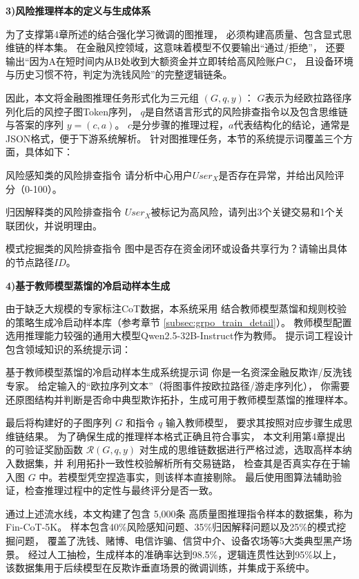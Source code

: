 \textbf{3)风险推理样本的定义与生成体系}

为了支撑第4章所述的结合强化学习微调的图推理，
必须构建高质量、包含显式思维链的样本集。
在金融风控领域，这意味着模型不仅要输出“通过/拒绝”，
还要输出“因为A在短时间内从B处收到大额资金并立即转给高风险账户C，
且设备环境与历史习惯不符，判定为洗钱风险”的完整逻辑链条。

因此，本文将金融图推理任务形式化为三元组 $(G, q, y)$：
$G$表示为经欧拉路径序列化后的风控子图Token序列，
$q$是自然语言形式的风险排查指令以及包含思维链与答案的序列 $y = (c, a)$。
$c$是分步骤的推理过程，$a$代表结构化的结论，通常是JSON格式，便于下游系统解析。
针对图推理任务，本节的系统提示词覆盖三个方面，具体如下：
\begin{prompt}{风险感知类的风险排查指令}
请分析中心用户$User_X$是否存在异常，并给出风险评分（0-100）。
\end{prompt}
\begin{prompt}{归因解释类的风险排查指令}
$User_X$被标记为高风险，请列出3个关键交易和1个关联团伙，并说明理由。
\end{prompt}
\begin{prompt}{模式挖掘类的风险排查指令}
图中是否存在资金闭环或设备共享行为？请输出具体的节点路径$ID$。
\end{prompt}

\textbf{4)基于教师模型蒸馏的冷启动样本生成}

由于缺乏大规模的专家标注CoT数据，本系统采用
结合教师模型蒸馏和规则校验的策略生成冷启动样本库（参考章节 \ref{subsec:grpo_train_detail}）。
教师模型配置选用推理能力较强的通用大模型Qwen2.5-32B-Instruct作为教师。
提示词工程设计包含领域知识的系统提示词：

\begin{prompt}{基于教师模型蒸馏的冷启动样本生成系统提示词}
你是一名资深金融反欺诈/反洗钱专家。
给定输入的“欧拉序列文本”（将图事件按欧拉路径/游走序列化），
你需要{还原图结构}并{判断是否命中典型欺诈拓扑}，生成可用于教师模型蒸馏的推理样本。
\end{prompt}



最后将构建好的子图序列 $G$ 和指令 $q$ 输入教师模型，
要求其按照对应步骤生成思维链结果。
为了确保生成的推理样本格式正确且符合事实，
本文利用第4章提出的可验证奖励函数 $\mathcal{R}(G, q, y)$ 
对生成的思维链数据进行严格过滤，选取高样本纳入数据集，并
利用拓扑一致性校验解析所有交易链路，
检查其是否真实存在于输入图 $G$ 中。若模型凭空捏造事实，则该样本直接剔除。
最后使用图算法辅助验证，检查推理过程中的定性与最终评分是否一致。

通过上述流水线，本文构建了包含 5,000条 高质量图推理指令样本的数据集，称为Fin-CoT-5K。
样本包含40\%风险感知问题、35\%归因解释问题以及25\%的模式挖掘问题，
覆盖了洗钱、赌博、电信诈骗、信贷中介、设备农场等5大类典型黑产场景。
经过人工抽检，生成样本的准确率达到98.5\%，逻辑连贯性达到95\%以上，
该数据集用于后续模型在反欺诈垂直场景的微调训练，并集成于系统中。

